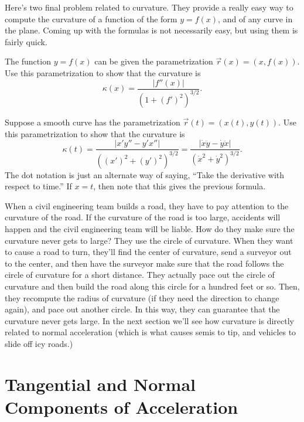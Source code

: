 Here's two final problem related to curvature.  They provide a really easy way to compute the curvature of a function of the form $y=f(x)$, and of any curve in the plane. Coming up with the formulas is not necessarily easy, but using them is fairly quick.  
\begin{problem}
%
 The function $y=f(x)$ can be given the parametrization  $\vec r(x) = (x,f(x))$.  Use this parametrization to show that the curvature is $$\kappa(x) = \frac{|f''(x)|}{(1+(f')^2)^{3/2}}.$$
\end{problem}

\begin{problem}[Optional]
%
 Suppose a smooth curve has the parametrization $\vec r(t) = (x(t),y(t))$.  Use this parametrization to show that the curvature is $$\kappa(t) = \frac{|x'y''-y'x''|}{((x')^2+(y')^2)^{3/2}} = \frac{|\dot{x} \ddot{y}-\dot{y} \ddot{x}|}{(\dot{x}^2+\dot {y}^2)^{3/2}} .$$ The dot notation is just an alternate way of saying, ``Take the derivative with respect to time.'' If $x=t$, then note that this gives the previous formula.
\end{problem}


When a civil engineering team builds a road, they have to pay attention to the curvature of the road.  If the curvature of the road is too large, accidents will happen and the civil engineering team will be liable. How do they make sure the curvature never gets to large?  They use the circle of curvature. When they want to cause a road to turn, they'll find the center of curvature, send a surveyor out to the center, and then have the surveyor make sure that the road follows the circle of curvature for a short distance. They actually pace out the circle of curvature and then build the road along this circle for a hundred feet or so.  Then, they recompute the radius of curvature (if they need the direction to change again), and pace out another circle.  In this way, they can guarantee that the curvature never gets large. In the next section we'll see how curvature is directly related to normal acceleration (which is what causes semis to tip, and vehicles to slide off icy roads.)

\section{Tangential and Normal Components of Acceleration}

